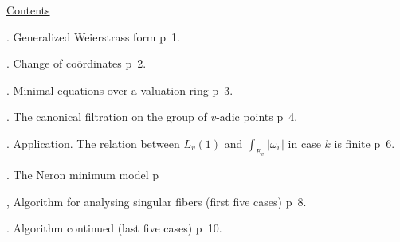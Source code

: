 \begin{center}\uline{Contents}\end{center}

. Generalized Weierstrass form \qquad p~1.

. Change of coördinates \qquad p~2.

. Minimal  equations over a valuation ring \qquad p~3.

. The canonical filtration on the group of $v$-adic points \qquad p~4.

. Application. The relation between $L_v(1)$ and $\int_{E_v}|\omega_v|$ in case $k$ is finite \qquad p~6.

. The Neron minimum model \qquad p~

, Algorithm for analysing singular fibers \quad (first five cases) \qquad p~8.

. Algorithm continued \quad (last five cases) \qquad p~10.

